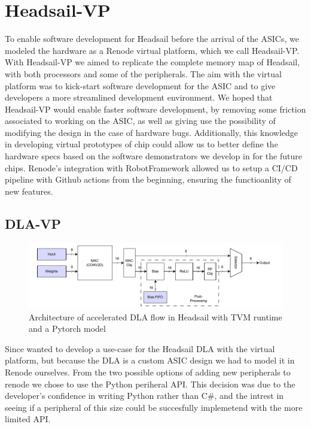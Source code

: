 \documentclass[12pt,a4paper,english
]{tunithesis}
\begin{document}
\section{Headsail-VP}
To enable software development for Headsail before the arrival of the ASICs, we modeled the hardware as a Renode virtual platform, which we call Headsail-VP. With Headsail-VP we aimed to replicate the complete memory map of Headsail, with both processors and some of the peripherals.
The aim with the virtual platform was to kick-start software development for the ASIC and to give developers a more streamlined development environment.
We hoped that Headsail-VP would enable faster software development, by removing some friction associated to working on the ASIC, as well as giving use the possibility of modifying the design in the case of hardware bugs.
Additionally, this knowledge in developing virtual prototypes of chip could allow us to better define the hardware specs based on the software demonstrators we develop in for the future chips.
Renode's integration with RobotFramework allowed us to setup a CI/CD pipeline with Github actions from the beginning, ensuring the functioanlity of new features.

\subsection{DLA-VP}

\begin{figure}
\centering
\includegraphics[width=\linewidth]{img/dla-internal.pdf}
\caption{Architecture of accelerated DLA flow in Headsail with TVM runtime and a Pytorch model}
\label{fig:dla_internal}
\end{figure}

Since wanted to develop a use-case for the Headsail DLA with the virtual platform, but because the DLA is a custom ASIC design we had to model it in Renode ourselves. From the two possible options of adding new peripherals to renode we chose to use the Python periheral API. This decision was due to the developer's confidence in writing Python rather than C\#, and the intrest in seeing if a peripheral of this size could be succesfully implemetend with the more limited API.
\end{document}
